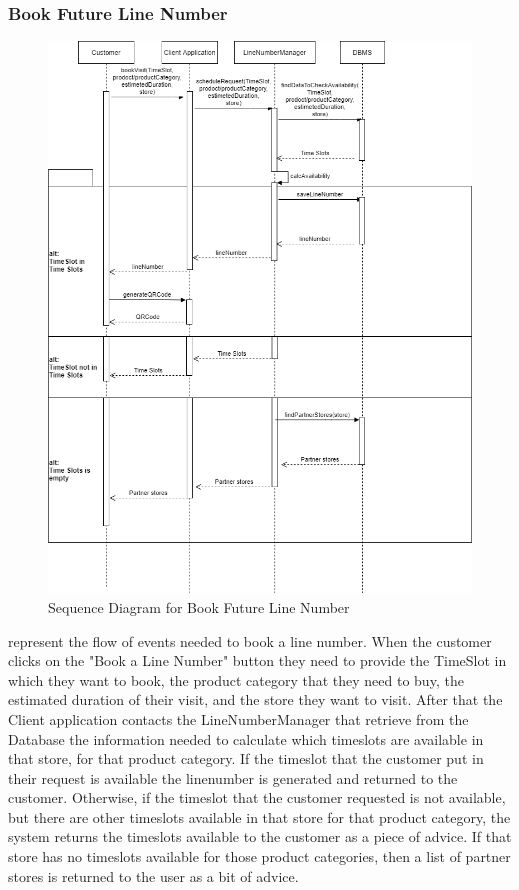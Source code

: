 \subsubsection{Book Future Line Number}
\begin{figure}[H]
    \centering
    \includegraphics[height=0.4\textwidth]{Images/CustomerSequenceDiagrams/BookLineNumberSequenceDiagram.png}
    \caption{Sequence Diagram for Book Future Line Number}
    \label{fig:SDBookLineNumber}
\end{figure}
 represent the flow of events needed to book a line number.
When the customer clicks on the "Book a Line Number" button they need to provide the TimeSlot in which they want to book, the product category that they need to buy, the estimated duration of their visit, and the store they want to visit.
After that the Client application contacts the LineNumberManager that retrieve from the Database the information needed to calculate which timeslots are available in that store, for that product category.
If the timeslot that the customer put in their request is available the linenumber is generated and returned to the customer.
Otherwise, if the timeslot that the customer requested is not available, but there are other timeslots available in that store for that product category, the system returns the timeslots available to the customer as a piece of advice.
If that store has no timeslots available for those product categories, then a list of partner stores is returned to the user as a bit of advice.

